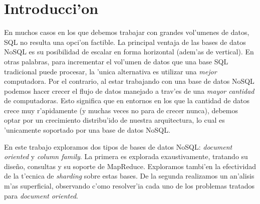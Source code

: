 \section{Introducci'on}

En muchos casos en los que debemos trabajar con grandes vol'umenes de datos, SQL no resulta una opci'on factible. La principal ventaja de las bases de datos NoSQL es su posibilidad de escalar en forma horizontal (adem'as de vertical). En otras palabras, para incrementar el vol'umen de datos que una base SQL tradicional puede procesar, la 'unica alternativa es utilizar una \emph{mejor} computadora. Por el contrario, al estar trabajando con una base de datos NoSQL podemos hacer crecer el flujo de datos manejado a trav'es de una \emph{mayor cantidad} de computadoras. Esto significa que en entornos en los que la cantidad de datos crece muy r'apidamente (y muchas veces no para de crecer nunca), debemos optar por un crecimiento distribu'ido de nuestra arquitectura, lo cual es 'unicamente soportado por una base de datos NoSQL.

En este trabajo exploramos dos tipos de bases de datos NoSQL: \textit{document oriented} y \textit{column family}. La primera es explorada exaustivamente, tratando su dise\~no, consultas y su soporte de MapReduce. Exploramos tambi'en la efectividad de la t'ecnica de \textit{sharding} sobre estas bases. De la segunda realizamos un an'alisis m'as superficial,  observando c'omo resolver'ia cada uno de los problemas tratados para \textit{document oriented}.

